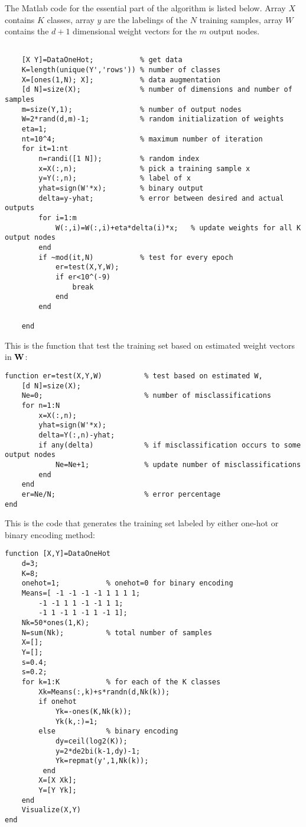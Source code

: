 \documentclass{article}
\begin{document}
The Matlab code for the essential part of the algorithm is listed below.
Array $X$ contains $K$ classes, array $y$ are the labelings of the $N$ 
training samples, array $W$ contains the $d+1$ dimensional weight vectors 
for the $m$ output nodes.

\begin{verbatim}

    [X Y]=DataOneHot;           % get data
    K=length(unique(Y','rows')) % number of classes
    X=[ones(1,N); X];           % data augmentation
    [d N]=size(X);              % number of dimensions and number of samples
    m=size(Y,1);                % number of output nodes
    W=2*rand(d,m)-1;            % random initialization of weights
    eta=1;
    nt=10^4;                    % maximum number of iteration
    for it=1:nt       
        n=randi([1 N]);         % random index
        x=X(:,n);               % pick a training sample x
        y=Y(:,n);               % label of x
        yhat=sign(W'*x);        % binary output
        delta=y-yhat;           % error between desired and actual outputs
        for i=1:m
            W(:,i)=W(:,i)+eta*delta(i)*x;   % update weights for all K output nodes
        end
        if ~mod(it,N)           % test for every epoch
            er=test(X,Y,W);
            if er<10^(-9)
                break
            end
        end
        
    end

\end{verbatim}

This is the function that test the training set based on estimated weight
vectors in ${\bf W}$:

\begin{verbatim}
function er=test(X,Y,W)          % test based on estimated W, 
    [d N]=size(X);
    Ne=0;                        % number of misclassifications
    for n=1:N
        x=X(:,n);
        yhat=sign(W'*x);
        delta=Y(:,n)-yhat;
        if any(delta)            % if misclassification occurs to some output nodes
            Ne=Ne+1;             % update number of misclassifications
        end
    end
    er=Ne/N;                     % error percentage
end
\end{verbatim}

This is the code that generates the training set labeled by either
one-hot or binary encoding method:

\begin{verbatim}
function [X,Y]=DataOneHot
    d=3;
    K=8;
    onehot=1;           % onehot=0 for binary encoding
    Means=[ -1 -1 -1 -1 1 1 1 1;
        -1 -1 1 1 -1 -1 1 1;
        -1 1 -1 1 -1 1 -1 1];
    Nk=50*ones(1,K);
    N=sum(Nk);          % total number of samples
    X=[];
    Y=[];
    s=0.4;
    s=0.2;
    for k=1:K           % for each of the K classes
        Xk=Means(:,k)+s*randn(d,Nk(k));
        if onehot
            Yk=-ones(K,Nk(k)); 
            Yk(k,:)=1;        
        else            % binary encoding
            dy=ceil(log2(K));
            y=2*de2bi(k-1,dy)-1;
            Yk=repmat(y',1,Nk(k));
         end
        X=[X Xk];
        Y=[Y Yk];
    end
    Visualize(X,Y)        
end

\end{verbatim}
\end{document}
